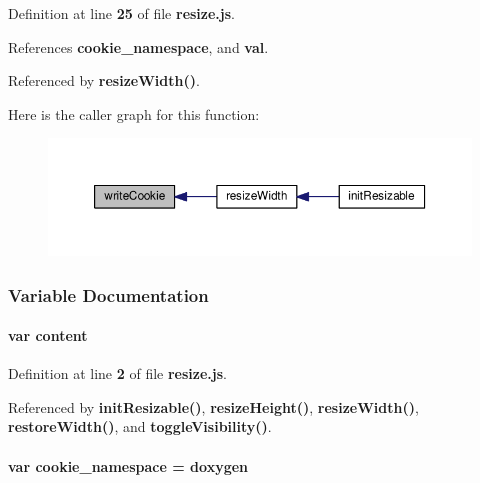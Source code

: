 Definition at line {\bf 25} of file {\bf resize.\+js}.



References {\bf cookie\+\_\+namespace}, and {\bf val}.



Referenced by {\bf resize\+Width()}.



Here is the caller graph for this function\+:
\nopagebreak
\begin{figure}[H]
\begin{center}
\leavevmode
\includegraphics[width=350pt]{da/d95/resize_8js_ad0822459a7d442b8c5e4db795d0aabb4_icgraph}
\end{center}
\end{figure}




\subsubsection{Variable Documentation}
\paragraph[{content}]{\setlength{\rightskip}{0pt plus 5cm}var content}\label{resize_8js_abaa405b2de1fea05ef421122098b4750}


Definition at line {\bf 2} of file {\bf resize.\+js}.



Referenced by {\bf init\+Resizable()}, {\bf resize\+Height()}, {\bf resize\+Width()}, {\bf restore\+Width()}, and {\bf toggle\+Visibility()}.

\paragraph[{cookie\+\_\+namespace}]{\setlength{\rightskip}{0pt plus 5cm}var cookie\+\_\+namespace = \textquotesingle{}doxygen\textquotesingle{}}\label{resize_8js_ab3321080c64c8797ebbcd6e30982c62c}


